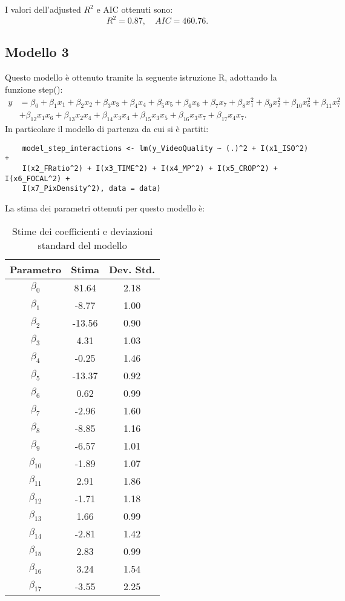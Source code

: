 I valori dell'adjusted $R^2$  e AIC ottenuti sono:
\begin{equation*}
	R^2 =   0.87, \quad AIC = 460.76.
\end{equation*}

\subsection{Modello 3}
Questo modello è ottenuto tramite la seguente istruzione R, adottando la funzione step():
\begin{align*}
	y &= \beta_0 
	+ \beta_1 x_1 + \beta_2 x_2 + \beta_3 x_3 + \beta_4 x_4 + \beta_5 x_5 
	+ \beta_6 x_6 + \beta_7 x_7 
	+ \beta_8 x_1^2 + \beta_9 x_2^2 + \beta_{10} x_6^2 + \beta_{11} x_7^2 \\
	&+ \beta_{12} x_1 x_6 + \beta_{13} x_2 x_4 + \beta_{14} x_3 x_4 
	+ \beta_{15} x_3 x_5 + \beta_{16} x_3 x_7 
	+ \beta_{17} x_4 x_7.
\end{align*}
In particolare il modello di partenza da cui si è partiti:
\begin{verbatim}
	model_step_interactions <- lm(y_VideoQuality ~ (.)^2 + I(x1_ISO^2) + 
	I(x2_FRatio^2) + I(x3_TIME^2) + I(x4_MP^2) + I(x5_CROP^2) + I(x6_FOCAL^2) + 
	I(x7_PixDensity^2), data = data)
\end{verbatim}
La stima dei parametri ottenuti per questo modello è:
\begin{table}[H]
	\centering
	\begin{tabular}{|c|c|c|}
		\hline
		\textbf{Parametro} & \textbf{Stima} & \textbf{Dev. Std.} \\
		\hline
		$\beta_0$   & 81.64  & 2.18 \\
		$\beta_1$   & -8.77  & 1.00 \\
		$\beta_2$   & -13.56 & 0.90 \\
		$\beta_3$   & 4.31   & 1.03 \\
		$\beta_4$   & -0.25  & 1.46 \\
		$\beta_5$   & -13.37 & 0.92 \\
		$\beta_6$   & 0.62   & 0.99 \\
		$\beta_7$   & -2.96  & 1.60 \\
		$\beta_8$   & -8.85  & 1.16 \\
		$\beta_9$   & -6.57  & 1.01 \\
		$\beta_{10}$ & -1.89  & 1.07 \\
		$\beta_{11}$ & 2.91   & 1.86 \\
		$\beta_{12}$ & -1.71  & 1.18 \\
		$\beta_{13}$ & 1.66   & 0.99 \\
		$\beta_{14}$ & -2.81  & 1.42 \\
		$\beta_{15}$ & 2.83   & 0.99 \\
		$\beta_{16}$ & 3.24   & 1.54 \\
		$\beta_{17}$ & -3.55  & 2.25 \\
		\hline
	\end{tabular}
	\caption{Stime dei coefficienti e deviazioni standard del modello}
	\label{tab:stima_coef_std}
\end{table}
